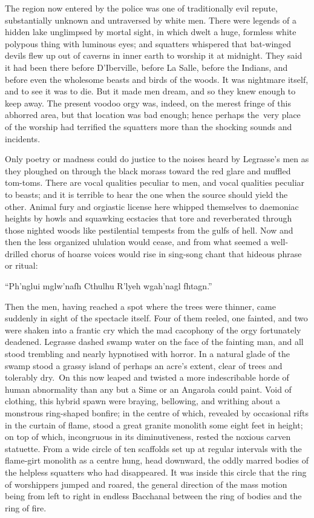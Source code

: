 The region now entered by the police was one of traditionally evil
repute, substantially unknown and untraversed by white men. There were
legends of a hidden lake unglimpsed by mortal sight, in which dwelt a
huge, formless white polypous thing with luminous eyes; and squatters
whispered that bat-winged devils flew up out of caverns in inner earth
to worship it at midnight. They said it had been there before
D'Iberville, before La Salle, before the Indians, and before even the
wholesome beasts and birds of the woods. It was nightmare itself, and to
see it was to die. But it made men dream, and so they knew enough to
keep away. The present voodoo orgy was, indeed, on the merest fringe of
this abhorred area, but that location was bad enough; hence perhaps the\est\ very place  of the worship had terrified the squatters more than the
shocking sounds and incidents.

Only poetry or madness could do justice to the noises heard by
Legrasse's men as they ploughed on through the black morass toward the
red glare and muffled tom-toms. There are vocal qualities peculiar to
men, and vocal qualities peculiar to beasts; and it is terrible to hear
the one when the source should yield the other. Animal fury and
orgiastic license here whipped themselves to daemoniac heights by howls
and squawking ecstacies that tore and reverberated through those nighted
woods like pestilential tempests from the gulfs of hell. Now and then
the less organized ululation would cease, and from what seemed a
well-drilled chorus of hoarse voices would rise in sing-song chant that
hideous phrase or ritual:

``Ph'nglui mglw'nafh Cthulhu R'lyeh wgah'nagl fhtagn.''

Then the men, having reached a spot where the trees were thinner, came
suddenly in sight of the spectacle itself. Four of them reeled, one
fainted, and two were shaken into a frantic cry which the mad cacophony
of the orgy fortunately deadened. Legrasse dashed swamp water on the
face of the fainting man, and all stood trembling and nearly hypnotised
with horror.
In a natural glade of the swamp stood a grassy island of perhaps an
acre's extent, clear of trees and tolerably dry.\est\ On this now leaped and
twisted a more indescribable horde of human abnormality than any but a
Sime or an Angarola could paint. Void of clothing, this hybrid spawn
were braying, bellowing, and writhing about a monstrous ring-shaped
bonfire; in the centre of which, revealed by occasional rifts in the
curtain of flame, stood a great granite monolith some eight feet in
height; on top of which, incongruous in its diminutiveness, rested the
noxious carven statuette. From a wide circle of ten scaffolds set up at
regular intervals with the flame-girt monolith as a centre hung, head
downward, the oddly marred bodies of the helpless squatters who had
disappeared. It was inside this circle that the ring of worshippers
jumped and roared, the general direction of the mass motion being from
left to right in endless Bacchanal between the ring of bodies and the
ring of fire.

